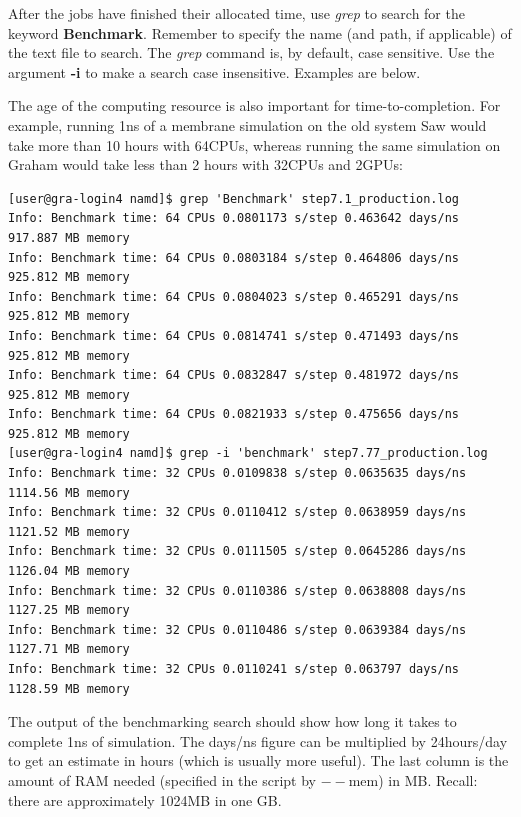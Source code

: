 \documentclass[12pt]{article}
\begin{document}
\quad After the jobs have finished their allocated time, use \textit{grep} to search for the keyword \textbf{Benchmark}. Remember to specify the name (and path, if applicable) of the text file to search. The \textit{grep} command is, by default, case sensitive. Use the argument \textbf{-i} to make a search case insensitive. Examples are below.


\quad The age of the computing resource is also important for time-to-completion. For example, running 1ns of a membrane simulation on the old system Saw would take more than 10 hours with 64CPUs, whereas running the same simulation on Graham would take less than 2 hours with 32CPUs and 2GPUs: 

\begin{lstlisting}[numbers=none, basicstyle=\scriptsize]
[user@gra-login4 namd]$ grep 'Benchmark' step7.1_production.log 
Info: Benchmark time: 64 CPUs 0.0801173 s/step 0.463642 days/ns 917.887 MB memory
Info: Benchmark time: 64 CPUs 0.0803184 s/step 0.464806 days/ns 925.812 MB memory
Info: Benchmark time: 64 CPUs 0.0804023 s/step 0.465291 days/ns 925.812 MB memory
Info: Benchmark time: 64 CPUs 0.0814741 s/step 0.471493 days/ns 925.812 MB memory
Info: Benchmark time: 64 CPUs 0.0832847 s/step 0.481972 days/ns 925.812 MB memory
Info: Benchmark time: 64 CPUs 0.0821933 s/step 0.475656 days/ns 925.812 MB memory
[user@gra-login4 namd]$ grep -i 'benchmark' step7.77_production.log
Info: Benchmark time: 32 CPUs 0.0109838 s/step 0.0635635 days/ns 1114.56 MB memory
Info: Benchmark time: 32 CPUs 0.0110412 s/step 0.0638959 days/ns 1121.52 MB memory
Info: Benchmark time: 32 CPUs 0.0111505 s/step 0.0645286 days/ns 1126.04 MB memory
Info: Benchmark time: 32 CPUs 0.0110386 s/step 0.0638808 days/ns 1127.25 MB memory
Info: Benchmark time: 32 CPUs 0.0110486 s/step 0.0639384 days/ns 1127.71 MB memory
Info: Benchmark time: 32 CPUs 0.0110241 s/step 0.063797 days/ns 1128.59 MB memory

\end{lstlisting} 

\quad The output of the benchmarking search should show how long it takes to complete 1ns of simulation. The days/ns figure can be multiplied by 24hours/day to get an estimate in hours (which is usually more useful). The last column is the amount of RAM needed (specified in the script by $--$mem) in MB. Recall: there are approximately 1024MB in one GB. 
\end{document}
